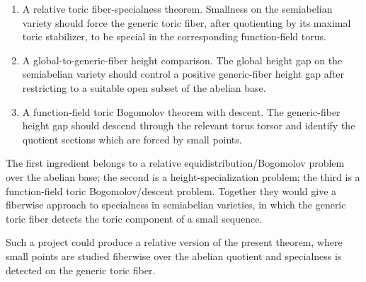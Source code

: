 \documentclass[10pt,a4paper]{amsart}
\theoremstyle{plain}
\theoremstyle{plain}
\numberwithin{equation}{section}
\begin{document}
\begin{enumerate}[label=\textup{(\roman*)},leftmargin=2em]
	\item A relative toric fiber-specialness theorem.  Smallness on the
	semiabelian variety should force the generic toric fiber, after quotienting by
	its maximal toric stabilizer, to be special in the corresponding
	function-field torus.
	
	\item A global-to-generic-fiber height comparison.  The global height gap on
	the semiabelian variety should control a positive generic-fiber height gap
	after restricting to a suitable open subset of the abelian base.
	
	\item A function-field toric Bogomolov theorem with descent.  The generic-fiber
	height gap should descend through the relevant torus torsor and identify the
	quotient sections which are forced by small points.
\end{enumerate}

The first ingredient belongs to a relative equidistribution/Bogomolov problem
over the abelian base; the second is a height-specialization problem; the
third is a function-field toric Bogomolov/descent problem.  Together they
would give a fiberwise approach to specialness in semiabelian varieties, in
which the generic toric fiber detects the toric component of a small sequence.

Such a project could produce a relative version of the present theorem, where
small points are studied fiberwise over the abelian quotient and specialness is
detected on the generic toric fiber.
\end{document}
